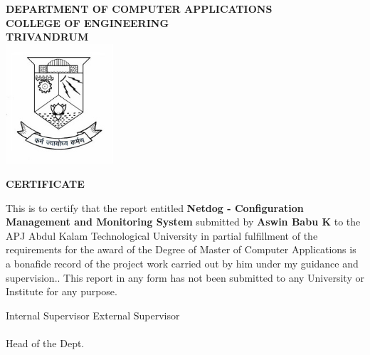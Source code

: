 \begin{titlepage}
\begin{center}

\textbf{DEPARTMENT OF COMPUTER APPLICATIONS}\\[0.5cm]
\textbf{ COLLEGE OF ENGINEERING \\ TRIVANDRUM}\\
[0.5cm]

\vspace{1.2cm}
\includegraphics[width=0.30\textwidth]{2.jpg}\\
\vspace{0.8cm}

\textbf{CERTIFICATE}\\
\end{center}

This is to certify that the report entitled 
\textbf{Netdog - Configuration Management and Monitoring System} submitted by
\textbf{Aswin Babu K} to the APJ Abdul Kalam Technological University in partial
fulfillment of the requirements for the award of the Degree of Master of
Computer Applications is a bonafide record of the project work carried out by
him under my guidance and supervision.. This report in any form has not been
submitted to any University or Institute for any purpose.

\vspace{1 cm}

\noindent Internal Supervisor 
\hfill External Supervisor 
\\ \\
\hfill Head of the Dept.

\end{titlepage}
